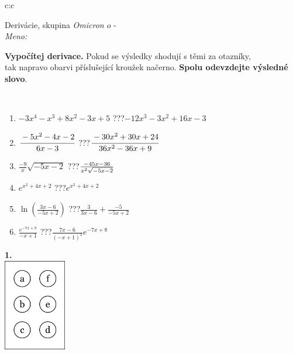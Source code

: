 \documentclass[10pt]{report}
\newcommand\omicron{o}
\begin{document}
\begin{tabular}{c:c}
\begin{minipage}[c][104.5mm][t]{0.5\linewidth}
\begin{center}
\vspace{7mm}
{\huge Derivácie, skupina \textit{Omicron $\omicron$} -}\\[5mm]
\textit{Meno:}\phantom{xxxxxxxxxxxxxxxxxxxxxxxxxxxxxxxxxxxxxxxxxxxxxxxxxxxxxxxxxxxxxxxxx}\\[5mm]
\begin{minipage}{0.95\linewidth}
\begin{center}
\textbf{Vypočítej derivace.} Pokud se výsledky shodují s těmi za otazníky,\\tak napravo obarvi příslušející kroužek načerno. \textbf{Spolu odevzdejte výsledné slovo}.
\end{center}
\end{minipage}
\\[1mm]
\begin{minipage}{0.79\linewidth}
\begin{center}
\begin{varwidth}{\linewidth}
\begin{enumerate}
\normalsize
\item $-3x^4-x^3+8x^2-3x+5$\quad \dotfill\; ???\;\dotfill \quad $-12x^3-3x^2+16x-3$
\item $\cfrac{-5x^2-4x-2}{6x-3}$\quad \dotfill\; ???\;\dotfill \quad $\cfrac{-30x^2+30x+24}{36x^2-36x+9}$
\item $\frac{-9}{x}\sqrt{-5x-2}$\quad \dotfill\; ???\;\dotfill \quad $\frac{-45x-36}{x^2 \sqrt{\smash[b]{-5x-2}}}$
\item $e^{x^2+4x+2}$\quad \dotfill\; ???\;\dotfill \quad $e^{x^2+4x+2}$
\item $\ln{\left(\frac{3x-6}{-5x+2}\right)}$\quad \dotfill\; ???\;\dotfill \quad $\frac{3}{3x-6}+\frac{-5}{-5x+2}$
\item $\frac{e^{-7x+8}}{-x+1}$\quad \dotfill\; ???\;\dotfill \quad $\frac{7x-6}{(-x+1)^2}e^{-7x+8}$
\end{enumerate}
\end{varwidth}
\end{center}
\end{minipage}
\begin{minipage}{0.20\linewidth}
\begin{center}
{\Huge\bfseries 1.} \\[2mm]
\includegraphics[height=40mm]{../images/braille.png}

\end{center}
\end{minipage}
\end{center}
\end{minipage}
\end{tabular}
\end{document}
